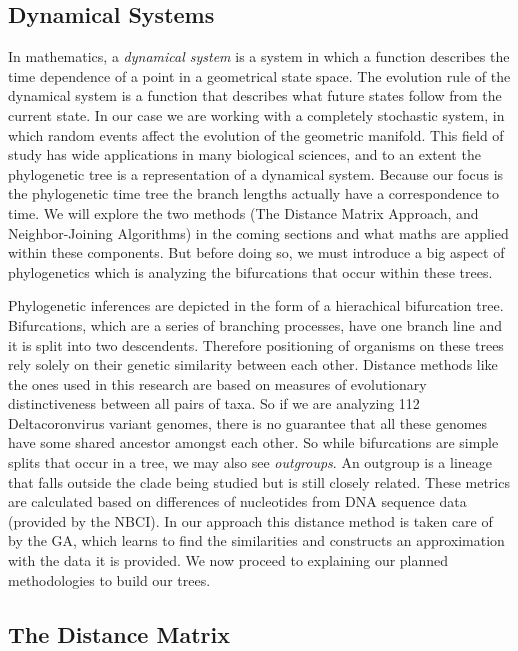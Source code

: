 \subsection{Dynamical Systems}

In mathematics, a \emph{dynamical system} is a system in which a function describes the time dependence of a point in a geometrical state space. The evolution rule of the dynamical system is a function that describes what future states follow from the current state. In our case we are working with a completely stochastic system, in which random events affect the evolution of the geometric manifold. This field of study has wide applications in many biological sciences, and to an extent the phylogenetic tree is a representation of a dynamical system. Because our focus is the phylogenetic time tree the branch lengths actually have a correspondence to time. We will explore the two methods (The Distance Matrix Approach, and Neighbor-Joining Algorithms) in the coming sections and what maths are applied within these components. But before doing so, we must introduce a big aspect of phylogenetics which is analyzing the bifurcations that occur within these trees.

Phylogenetic inferences are depicted in the form of a hierachical bifurcation tree. Bifurcations, which are a series of branching processes, have one branch line and it is split into two descendents. \cite{Ecology} Therefore positioning of organisms on these trees rely solely on their genetic similarity between each other. Distance methods like the ones used in this research are based on measures of evolutionary distinctiveness between all pairs of taxa. So if we are analyzing 112 Deltacoronvirus variant genomes, there is no guarantee that all these genomes have some shared ancestor amongst each other. So while bifurcations are simple splits that occur in a tree, we may also see \emph{outgroups}. An outgroup is a lineage that falls outside the clade being studied but is still closely related. \cite{Clade} These metrics are calculated based on differences of nucleotides from DNA sequence data (provided by the NBCI). In our approach this distance method is taken care of by the GA, which learns to find the similarities and constructs an approximation with the data it is provided. We now proceed to explaining our planned methodologies to build our trees.    

\subsection{The Distance Matrix}

